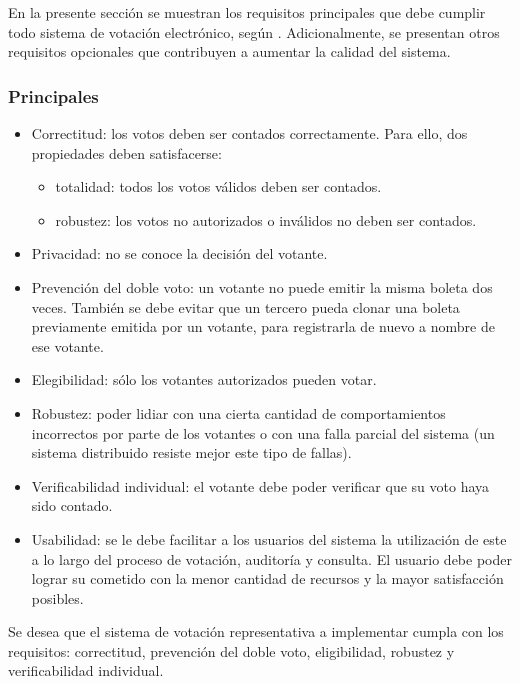 En la presente sección se muestran los requisitos principales que debe cumplir todo sistema de votación electrónico, seg\'un \cite{wang2017review}. Adicionalmente, se presentan otros requisitos opcionales que contribuyen a aumentar la calidad del sistema.

\subsubsection{Principales}

\begin{itemize}
\item
  Correctitud: los votos deben ser contados correctamente. Para ello,
  dos propiedades deben satisfacerse:

  \begin{itemize}
  \item
    totalidad: todos los votos válidos deben ser contados.
  \item
    robustez: los votos no autorizados o inválidos no deben ser
    contados.
  \end{itemize}
\item
  Privacidad: no se conoce la decisión del votante.
\item
  Prevención del doble voto: un votante no puede emitir la misma boleta
  dos veces. También se debe evitar que un tercero pueda clonar una
  boleta previamente emitida por un votante, para registrarla de nuevo a
  nombre de ese votante.
\item
  Elegibilidad: s\'olo los votantes autorizados pueden votar.
\item
  Robustez: poder lidiar con una cierta cantidad de comportamientos
  incorrectos por parte de los votantes o con una falla parcial del
  sistema (un sistema distribuido resiste mejor este tipo de fallas).
\item
  Verificabilidad individual: el votante debe poder verificar que su
  voto haya sido contado.
\item
  Usabilidad: se le debe facilitar a los usuarios del sistema la
  utilización de este a lo largo del proceso de votación, auditoría y
  consulta. El usuario debe poder lograr su cometido con la menor
  cantidad de recursos y la mayor satisfacción posibles.
\end{itemize}

Se desea que el sistema de votaci\'on representativa a implementar cumpla con los requisitos: correctitud, prevenci\'on del doble voto, eligibilidad, robustez y verificabilidad individual.

